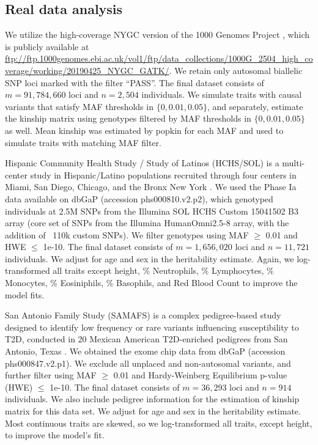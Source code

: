 \documentclass[11pt]{article}
\begin{document}
\subsection{Real data analysis}

We utilize the high-coverage NYGC version of the 1000 Genomes Project \citep{fairley_international_2020}, which is publicly available at \url{ftp://ftp.1000genomes.ebi.ac.uk/vol1/ftp/data_collections/1000G_2504_high_coverage/working/20190425_NYGC_GATK/}. We retain only autosomal biallelic SNP loci marked with the filter ``PASS''. The final dataset consists of $m=91,784,660$ loci and $n=2,504$ individuals. We simulate traits with causal variants that satisfy MAF thresholds in $\{0,0.01,0.05\}$, and separately, estimate the kinship matrix using genotypes filtered by MAF thresholds in $\{0,0.01,0.05\}$ as well.
Mean kinship was estimated by popkin for each MAF and used to simulate traits with matching MAF filter.

Hispanic Community Health Study / Study of Latinos (HCHS/SOL) is a multi-center study in Hispanic/Latino populations recruited through four centers in Miami, San Diego, Chicago, and the Bronx New York \citep{sorlie2010design}. We used the Phase Ia data available on dbGaP (accession phs000810.v2.p2), which genotyped individuals at 2.5M SNPs from the Illumina SOL HCHS Custom 15041502 B3 array (core set of SNPs from the Illumina HumanOmni2.5-8 array, with the addition of ~110k custom SNPs).
We filter genotypes using MAF $\ge$ 0.01 and HWE $\le$ 1e-10. The final dataset consists of $m=1,656,020 $ loci and $n=11,721 $ individuals. We adjust for age and sex in the heritability estimate. Again, we log-transformed all traits except height, \% Neutrophils, \% Lymphocytes, \% Monocytes, \% Eosiniphils, \% Basophils, and Red Blood Count to improve the model fits.

San Antonio Family Study (SAMAFS) is a complex pedigree-based study designed to identify low frequency or rare variants influencing susceptibility to T2D, conducted in 20 Mexican American T2D-enriched pedigrees from San Antonio, Texas  \citep{mitchell1996genetic}. We obtained the exome chip data from dbGaP (accession phs000847.v2.p1). We exclude all unplaced and non-autosomal variants, and further filter using MAF $\ge$ 0.01 and Hardy-Weinberg Equilibrium p-value (HWE) $\le$ 1e-10. The final dataset consists of $m=36,293$ loci and $n=914 $ individuals. We also include pedigree information for the estimation of kinship matrix for this data set. We adjust for age and sex in the heritability estimate. Most continuous traits are skewed, so we log-transformed all traits, except height, to improve the model's fit.
\end{document}

